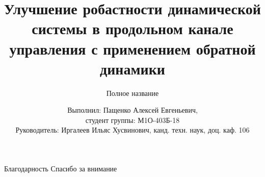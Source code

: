 \documentclass[unicode]{beamer}   %
\title[Дипломная работа]{Улучшение робастности динамической системы в продольном канале управления с применением обратной динамики}
\subtitle[Краткое название]{Полное название}
\author{Выполнил: Пащенко Алексей Евгеньевич, \\ студент группы: М1О-403Б-18 \\ \hfill \break Руководитель: Иргалеев Ильяс Хусвинович, канд. техн. наук, доц. каф. 106}
\institute[МАИ]{Московский авиационный институт}
\date{}
\begin{document}
\maketitle







% 


\begin{frame}{Благодарность}
\centering
\huge    %
Спасибо за внимание
\end{frame}
\end{document}
